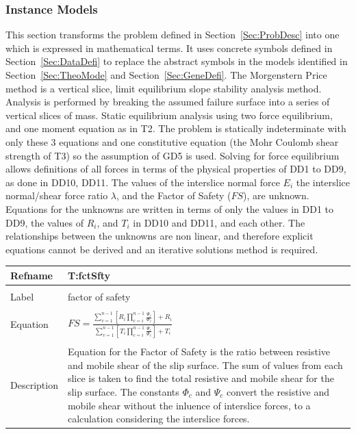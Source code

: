 \documentclass[12pt]{article}
\begin{document}
\subsubsection{Instance Models}
\label{Sec:InstMode}
This section transforms the problem defined in Section~\ref{Sec:ProbDesc} into one which is expressed in mathematical terms. It uses concrete symbols defined in Section~\ref{Sec:DataDefi} to replace the abstract symbols in the models identified in Section~\ref{Sec:TheoMode} and Section~\ref{Sec:GeneDefi}.
The Morgenstern Price method is a vertical slice, limit equilibrium slope stability analysis method. Analysis is performed by breaking the assumed failure surface into a series of vertical slices of mass. Static equilibrium analysis using two force equilibrium, and one moment equation as in T2. The problem is statically indeterminate with only these 3 equations and one constitutive equation (the Mohr Coulomb shear strength of T3) so the assumption of GD5 is used. Solving for force equilibrium allows definitions of all forces in terms of the physical properties of DD1 to DD9, as done in DD10, DD11.
The values of the interslice normal force $E_{i}$ the interslice normal/shear force ratio $\lambda{}$, and the Factor of Safety ($FS$), are unknown. Equations for the unknowns are written in terms of only the values in DD1 to DD9, the values of $R_{i}$, and $T_{i}$ in DD10 and DD11, and each other. The relationships between the unknowns are non linear, and therefore explicit equations cannot be derived and an iterative solutions method is required.
~\newline
\noindent \begin{minipage}{\textwidth}
\begin{tabular}{p{} p{}}
\toprule \textbf{Refname} & \textbf{T:fctSfty}
\label{T:fctSfty}
\\ \midrule \\
Label & factor of safety
\\ \midrule \\
Equation & $FS=\frac{\displaystyle\sum_{v=1}^{n-1}{\left[R_{i}\displaystyle\prod_{c=i}^{n-1}{\frac{\Psi{}_{c}}{\Phi{}_{c}}}\right]}+R_{i}}{\displaystyle\sum_{v=1}^{n-1}{\left[T_{i}\displaystyle\prod_{c=i}^{n-1}{\frac{\Psi{}_{c}}{\Phi{}_{c}}}\right]}+T_{i}}$
\\ \midrule \\
Description & Equation for the Factor of Safety is the ratio between resistive and mobile shear of the slip surface. The sum of values from each slice is taken to find the total resistive and mobile shear for the slip surface. The constants $\Phi{}_{c}$ and $\Psi{}_{c}$ convert the resistive and mobile shear without the inluence of interslice forces, to a calculation considering the interslice forces.
\\ \bottomrule \end{tabular}
\end{minipage}\\
\end{document}
